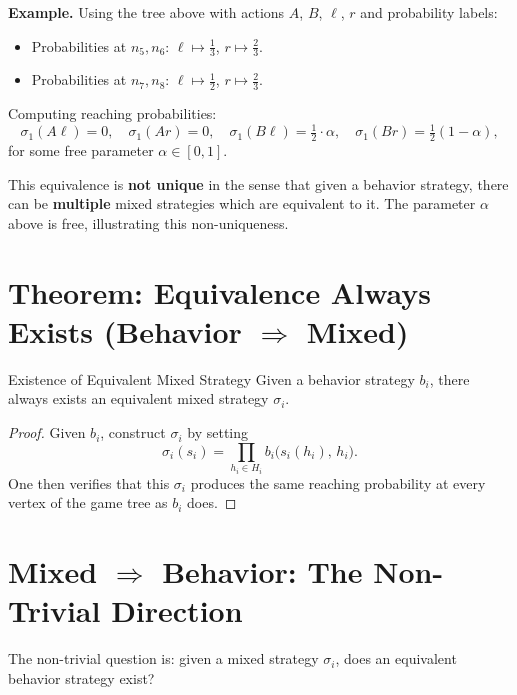 \documentclass[12pt, a4paper]{article}
\begin{document}
\medskip
\noindent\textbf{Example.} Using the tree above with actions $A$, $B$, $\ell$, $r$ and probability labels:
\begin{itemize}
  \item Probabilities at $n_5, n_6$: $\ell \mapsto \tfrac{1}{3}$, $r \mapsto \tfrac{2}{3}$.
  \item Probabilities at $n_7, n_8$: $\ell \mapsto \tfrac{1}{2}$, $r \mapsto \tfrac{2}{3}$.
\end{itemize}

Computing reaching probabilities:
\[
  \sigma_1(A\ell) = 0,\quad \sigma_1(Ar) = 0, \quad
  \sigma_1(B\ell) = \tfrac{1}{2} \cdot \alpha, \quad \sigma_1(Br) = \tfrac{1}{2}(1-\alpha),
\]
for some free parameter $\alpha \in [0,1]$.

\begin{notebox}
  This equivalence is \textbf{not unique} in the sense that given a behavior strategy, there can be \textbf{multiple} mixed strategies which are equivalent to it. The parameter $\alpha$ above is free, illustrating this non-uniqueness.
\end{notebox}

\section{Theorem: Equivalence Always Exists (Behavior $\Rightarrow$ Mixed)}

\begin{thmbox}{Existence of Equivalent Mixed Strategy}
  Given a behavior strategy $b_i$, there always exists an equivalent mixed strategy $\sigma_i$.
\end{thmbox}

\begin{proof}
  Given $b_i$, construct $\sigma_i$ by setting
  \[
    \sigma_i(s_i) = \prod_{h_i \in H_i} b_i\!\bigl(s_i(h_i),\, h_i\bigr).
  \]
  One then verifies that this $\sigma_i$ produces the same reaching probability at every vertex of the game tree as $b_i$ does.
\end{proof}

\section{Mixed $\Rightarrow$ Behavior: The Non-Trivial Direction}

The non-trivial question is: given a mixed strategy $\sigma_i$, does an equivalent behavior strategy exist?
\end{document}
